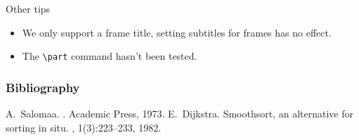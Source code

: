 \documentclass[no-math, aspectratio=1610, 10pt]{beamer}
\begin{document}
    \begin{frame}[fragile]{Other tips}
        \begin{itemize}
            \item We only support a frame title, setting subtitles for frames has no effect.
            \item The \verb|\part| command hasn't been tested.
        \end{itemize}
    \end{frame}

    \begin{frame}
        \frametitle{Bibliography}
        \begin{thebibliography}{Dijkstra, 1982}
          A.~Salomaa.
          .
          \newblock Academic Press, 1973.
          E.~Dijkstra.
          \newblock Smoothsort, an alternative for sorting in situ.
          , 1(3):223--233, 1982.
        \end{thebibliography}
      \end{frame}
\end{document}
